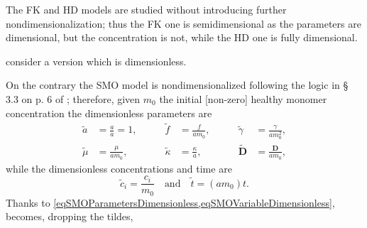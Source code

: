                 The FK and HD models are studied without introducing further nondimensionalization; thus the FK one is semidimensional as the parameters are dimensional, but the concentration is not, while the HD one is fully dimensional.

                \cite{Goriely2019} consider a version \SMOcontinuous{} which is dimensionless.

                On the contrary the SMO model is nondimensionalized following the logic in § 3.3 on p. 6 of \cite{Goriely2019}; therefore, given $m_0$ the initial [non-zero] healthy monomer concentration the dimensionless parameters are
                \begin{equation}
                    \newcommand\hspcC{\qquad}
                    \begin{alignedat}{4}
                        \tilde a&=\frac aa=1,&\hspcC
                        \tilde f&=\frac f{am_0},&\hspcC
                        \tilde\gamma&=\frac\gamma{am^2_0},\\
                        \tilde\mu&=\frac\mu{am_0},&\hspcC
                        \tilde\kappa&=\frac\kappa a,&\hspcC
                        \tilde{\mathbf D}&=\frac{\mathbf D}{am_0},
                    \end{alignedat}
                    \label{eqSMOParametersDimensionless}
                \end{equation}
                while the dimensionless concentrations and time are
                \begin{equation}
                    \tilde c_i=\frac{c_i}{m_0}
                    \quad\text{and}\quad
                    \tilde t=(am_0)t.
                    \label{eqSMOVariableDimensionless}
                \end{equation}
                Thanks to \cref{eqSMOParametersDimensionless,eqSMOVariableDimensionless}, \SMOcontinuous{} becomes, dropping the tildes,
